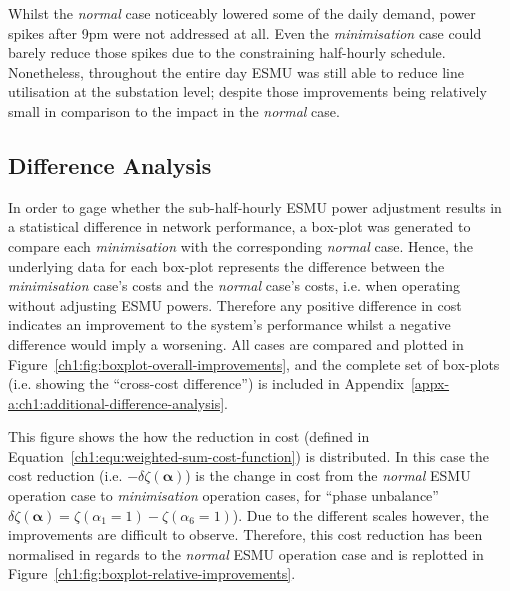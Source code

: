 

Whilst the \textit{normal} case noticeably lowered some of the daily demand, power spikes after  9pm were not addressed at all.
Even the \textit{minimisation} case could barely reduce those spikes due to the constraining half-hourly schedule.
Nonetheless, throughout the entire day ESMU was still able to reduce line utilisation at the substation level; despite those improvements being relatively small in comparison to the impact in the \textit{normal} case.

\subsection{Difference Analysis}
\label{ch1:subsec:difference-analysis}

In order to gage whether the sub-half-hourly ESMU power adjustment results in a statistical difference in network performance, a box-plot was generated to compare each \textit{minimisation} with the corresponding \textit{normal} case.
Hence, the underlying data for each box-plot represents the difference between the \textit{minimisation} case's costs and the \textit{normal} case's costs, i.e. when operating without adjusting ESMU powers.
Therefore any positive difference in cost indicates an improvement to the system's performance whilst a negative difference would imply a worsening.
All cases are compared and plotted in Figure~\ref{ch1:fig:boxplot-overall-improvements}, and the complete set of box-plots (i.e. showing the ``cross-cost difference'') is included in Appendix~\ref{appx-a:ch1:additional-difference-analysis}.



This figure shows the how the reduction in cost (defined in Equation~\ref{ch1:equ:weighted-sum-cost-function}) is distributed.
In this case the cost reduction (i.e. $-\delta\zeta(\boldsymbol{\alpha})$) is the change in cost from the \textit{normal} ESMU operation case to \textit{minimisation} operation cases,  for ``phase unbalance'' $\delta\zeta(\boldsymbol{\alpha}) = \zeta(\alpha_1 = 1) - \zeta(\alpha_6 = 1)$).
Due to the different scales however, the improvements are difficult to observe.
Therefore, this cost reduction has been normalised in regards to the \textit{normal} ESMU operation case and is replotted in Figure~\ref{ch1:fig:boxplot-relative-improvements}.



